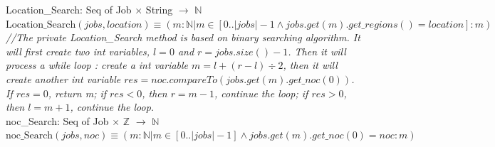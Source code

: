 \documentclass[12pt]{article}
\begin{document}
\noindent Location\_Search: Seq of Job $\times$ String  $ \rightarrow $ $\mathbb{N}$\\
\noindent $\text{Location\_Search}(jobs, location) \equiv (m: \mathbb{N} | m \in [0 .. |jobs|-1 \wedge jobs.get(m).get\_regions() = location]
: m)$\\

\noindent \textit{//The private Location\_Search method is based on binary searching algorithm. It will first create two int variables, $l = 0$ and $r = jobs.size()-1$. Then it will process a while loop : create a int variable $m = l + (r - l) \div 2$, then it will create another int variable $res = noc.compareTo(jobs.get(m).get\_noc(0))$. If $res = 0$, return m; if $res < 0$, then $r = m-1$, continue the loop; if $res > 0$, then $l = m + 1$, continue the loop.}\\

\noindent noc\_Search: Seq of Job $\times$ $\mathbb{Z}$  $ \rightarrow $ $\mathbb{N}$\\
\noindent $\text{noc\_Search}(jobs, noc) \equiv (m: \mathbb{N} | m \in [0 .. |jobs|-1] \wedge jobs.get(m).get\_noc(0) = noc
: m)$\\
\end{document}

